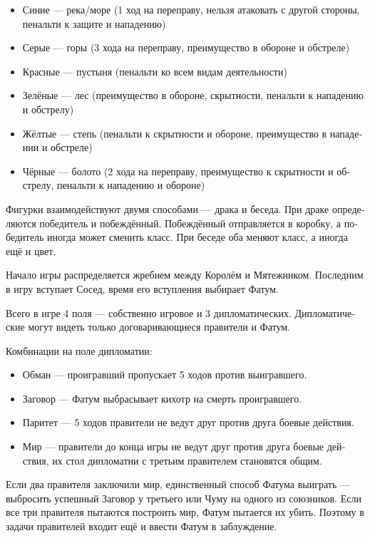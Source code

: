 \documentclass[a4paper,12pt,fleqn]{book}\usepackage{cooltooltips}\usepackage{polyglossia}\setdefaultlanguage[babelshorthands=true]{russian}\setotherlanguage{english}\defaultfontfeatures{Ligatures=TeX,Mapping=tex-text} \usepackage{xcolor}\definecolor{lightgray}{HTML}{bbbbbb}\color{lightgray}\newcommand{\ml}[3]{\textenglish{\textcolor{black}{#3}}}
\begin{document}
{\begin{itemize}
\item Синие --- река/море (1 ход на переправу, нельзя атаковать с другой стороны, пенальти к защите и нападению)
\item Серые --- горы (3 хода на переправу, преимущество в обороне и обстреле)
\item Красные --- пустыня (пенальти ко всем видам деятельности)
\item Зелёные --- лес (преимущество в обороне, скрытности, пенальти к нападению и обстрелу)
\item Жёлтые --- степь (пенальти к скрытности и обороне, преимущество в нападении и обстреле)
\item Чёрные --- болото (2 хода на переправу, преимущество к скрытности и обстрелу, пенальти к нападению и обороне)
\end{itemize}

Фигурки взаимодействуют двумя способами --- драка и беседа.
При драке определяются победитель и побеждённый.
Побеждённый отправляется в коробку, а победитель иногда может сменить класс.
При беседе оба меняют класс, а иногда ещё и цвет.

Начало игры распределяется жребием между Королём и Мятежником.
Последним в игру вступает Сосед, время его вступления выбирает Фатум.

Всего в игре 4 поля --- собственно игровое и 3 дипломатических.
Дипломатические могут видеть только договаривающиеся правители и Фатум.

Комбинации на поле дипломатии:

\begin{itemize}
\item Обман --- проигравший пропускает 5 ходов против выигравшего.
\item Заговор --- Фатум выбрасывает кихотр на смерть проигравшего.
\item Паритет --- 5 ходов правители не ведут друг против друга боевые действия.
\item Мир --- правители до конца игры не ведут друг против друга боевые действия, их стол дипломатии с третьим правителем становятся общим.
\end{itemize}

Если два правителя заключили мир, единственный способ Фатума выиграть --- выбросить успешный Заговор у третьего или Чуму на одного из союзников.
Если все три правителя пытаются построить мир, Фатум пытается их убить.
Поэтому в задачи правителей входит ещё и ввести Фатум в заблуждение.

}
\end{document}
